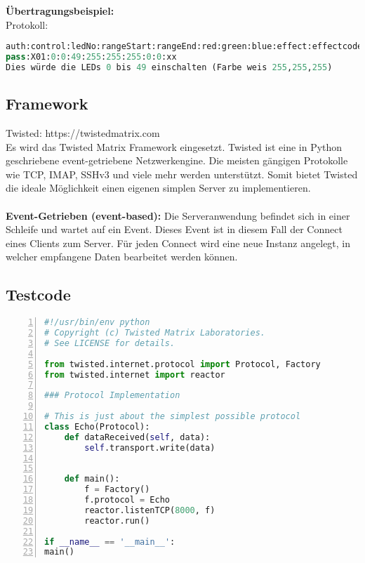 \textbf{Übertragungsbeispiel:}\\
		Protokoll: 	
\begin{lstlisting}[caption = Beispielübertragung des Protokolls, language=python, frame=single, breaklines=true,columns=fullflexible, commentstyle=\color{gray}\upshape, captionpos=b]
auth:control:ledNo:rangeStart:rangeEnd:red:green:blue:effect:effectcode:hash
pass:X01:0:0:49:255:255:255:0:0:xx
Dies würde die LEDs 0 bis 49 einschalten (Farbe weis 255,255,255)
\end{lstlisting}
\subsection{Framework}
Twisted: https://twistedmatrix.com \\
Es wird das Twisted Matrix Framework eingesetzt. Twisted ist eine in Python geschriebene  event-getriebene Netzwerkengine. Die meisten gängigen Protokolle wie TCP, IMAP, SSHv3 und viele mehr werden unterstützt. Somit bietet Twisted die ideale Möglichkeit einen eigenen simplen Server zu implementieren. \\\\
\textbf{Event-Getrieben (event-based):} Die Serveranwendung befindet sich in einer Schleife und wartet auf ein Event. Dieses Event ist in diesem Fall der Connect eines Clients zum Server. Für jeden Connect wird eine neue Instanz angelegt, in welcher empfangene Daten bearbeitet werden können. 

\subsection{Testcode}
\begin{lstlisting}[caption =Testcode Echoserver mit Twisted Framework, language=python, frame=single, breaklines=true,columns=fullflexible, commentstyle=\color{gray}\upshape, captionpos=b, numbers = left]
#!/usr/bin/env python
# Copyright (c) Twisted Matrix Laboratories.
# See LICENSE for details.

from twisted.internet.protocol import Protocol, Factory
from twisted.internet import reactor

### Protocol Implementation

# This is just about the simplest possible protocol
class Echo(Protocol):
	def dataReceived(self, data):
		self.transport.write(data)


	def main():
		f = Factory()
		f.protocol = Echo
		reactor.listenTCP(8000, f)
		reactor.run()

if __name__ == '__main__':
main()
\end{lstlisting}

